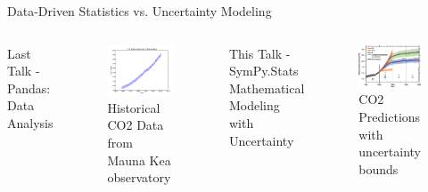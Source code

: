 \documentclass[compress, blue]{beamer}
\begin{document}
\begin{frame}{Data-Driven Statistics vs. Uncertainty Modeling}

\begin{columns}
    Last Talk - Pandas:
    \indent Data Analysis
    \begin{figure}
        \includegraphics[width=\textwidth]{images/mauna-kea-co2.pdf}
        \caption{Historical CO2 Data from Mauna Kea observatory}
    \end{figure}
    This Talk - SymPy.Stats
    \indent Mathematical Modeling with Uncertainty
    \begin{figure}
        \includegraphics[width=\textwidth]{images/figure-ts-32-l.png}
        \caption{CO2 Predictions with uncertainty bounds}
    \end{figure}
\end{columns}
\end{frame}
\end{document}
